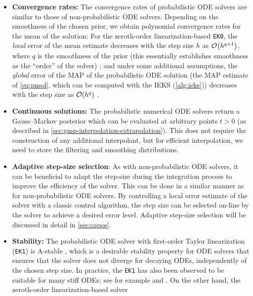 \documentclass{mimosis}
\begin{document}
\begin{itemize}[left=0pt .. \parindent]
\item \textbf{Convergence rates:}
The convergence rates of probabilistic ODE solvers are similar to those of non-probabilistic ODE solvers.
Depending on the smoothness of the chosen prior, we obtain polynomial convergence rates for the mean of the solution:
For the zeroth-order linearization-based \texttt{EK0},
the \emph{local} error of the mean estimate decreases with the step size \(h\) as \(\order{h^{q+1}}\), where \(q\) is the smoothness of the prior (this essentially establishes smoothness as the ``order'' of the solver)
\parencite{kersting18_conver_rates_gauss_ode_filter};
and under some additional assumptions, the \emph{global} error of the MAP of the probabilistic ODE solution (the MAP estimate of \cref{eq:pnsol}, which can be computed with the IEKS (\cref{alg:ieks}))
decreases with the step size as \(\order{h^q}\)
\parencite{tronarp20_bayes_ode_solver}.
\item \textbf{Continuous solutions:}
The probabilistic numerical ODE solvers return a Gauss--Markov posterior which can be evaluated at arbitrary points \(t>0\)
(as described in \cref{sec:gmp-interpolation-extrapolation}).
This does not require the construction of any additional interpolant, but for efficient interpolation, we need to store the filtering and smoothing distributions.
\item \textbf{Adaptive step-size selection}:
As with non-probabilistic ODE solvers, it can be beneficial to adapt the step-size during the integration process to improve the efficiency of the solver.
This can be done in a similar manner as for non-probabilistic ODE solvers.
By controlling a local error estimate of the solver with a classic control algorithm, the step size can be selected on-line by the solver to achieve a desired error level.
Adaptive step-size selection will be discussed in detail in
\cref{sec:capos}.
\item \textbf{Stability:}
The probabilistic ODE solver with first-order Taylor linearization (\texttt{EK1}) is A-stable \parencite{tronarp18_probab_solut_to_ordin_differ}, which is a desirable stability property for ODE solvers that ensures that
the solver does not diverge for decaying ODEs,
independently of the chosen step size.
In practice, the \texttt{EK1} has also been observed to be suitable for many stiff ODEs; see for example  and \parencite{kraemer20_stabl_implem_probab_ode_solver}.
On the other hand, the zeroth-order linearization-based solver

\end{itemize}
\end{document}
